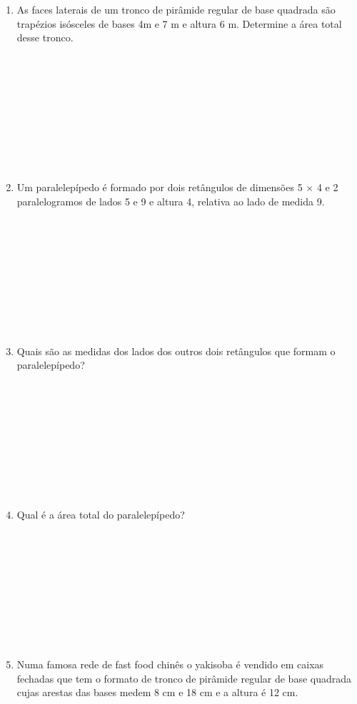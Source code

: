 \documentclass[a4paper,14pt]{article}
\begin{document}
\begin{multicols}{2}
\begin{enumerate}
            \item As faces laterais de um tronco de pirâmide regular de base quadrada são trapézios isósceles de bases 4m e 7 m e altura 6 m. Determine a área total desse tronco.\\\\\\\\\\\\\\\\\\\\
            \item Um paralelepípedo é formado por dois retângulos de dimensões 5 $\times$ 4 e 2 paralelogramos de lados 5 e 9 e altura 4, relativa ao lado de medida 9. \\\\\\\\\\\\\\\\\\\\
            \item Quais são as medidas dos lados dos outros dois retângulos que formam o paralelepípedo?\\\\\\\\\\\\\\\\\\\\
            \item Qual é a área total do paralelepípedo?\\\\\\\\\\\\\\\\\\\\
            \item Numa famosa rede de fast food chinês o yakisoba é vendido em caixas fechadas que tem o formato de tronco de pirâmide regular de base quadrada cujas arestas das bases medem 8 cm e 18 cm e a altura é 12 cm.

\end{enumerate}
\end{multicols}
\end{document}
